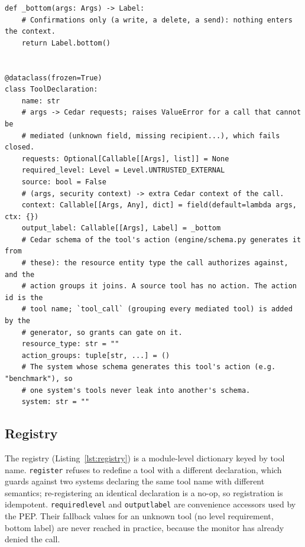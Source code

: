 \documentclass[11pt,a4paper]{article}
\DeclareRobustCommand{\code}[1]{{\renewcommand{\_}{\textunderscore\allowbreak}\texttt{#1}}}
\begin{document}
\begin{lstlisting}[firstnumber=38,style=py,caption={Tool declaration (\texttt{engine/tool\_contract.py}, lines 38--63)},label={lst:decl}]
def _bottom(args: Args) -> Label:
    # Confirmations only (a write, a delete, a send): nothing enters the context.
    return Label.bottom()


@dataclass(frozen=True)
class ToolDeclaration:
    name: str
    # args -> Cedar requests; raises ValueError for a call that cannot be
    # mediated (unknown field, missing recipient...), which fails closed.
    requests: Optional[Callable[[Args], list]] = None
    required_level: Level = Level.UNTRUSTED_EXTERNAL
    source: bool = False
    # (args, security context) -> extra Cedar context of the call.
    context: Callable[[Args, Any], dict] = field(default=lambda args, ctx: {})
    output_label: Callable[[Args], Label] = _bottom
    # Cedar schema of the tool's action (engine/schema.py generates it from
    # these): the resource entity type the call authorizes against, and the
    # action groups it joins. A source tool has no action. The action id is the
    # tool name; `tool_call` (grouping every mediated tool) is added by the
    # generator, so grants can gate on it.
    resource_type: str = ""
    action_groups: tuple[str, ...] = ()
    # The system whose schema generates this tool's action (e.g. "benchmark"), so
    # one system's tools never leak into another's schema.
    system: str = ""
\end{lstlisting}

\subsection{Registry}

The registry (Listing~\ref{lst:registry}) is a module-level dictionary keyed by tool
name. \code{register} refuses to redefine a tool with a different declaration, which
guards against two systems declaring the same tool name with different semantics;
re-registering an identical declaration is a no-op, so registration is idempotent.
\code{required\_level} and \code{output\_label} are convenience accessors used by the PEP.
Their fallback values for an unknown tool (no level requirement, bottom label) are never
reached in practice, because the monitor has already denied the call.
\end{document}
